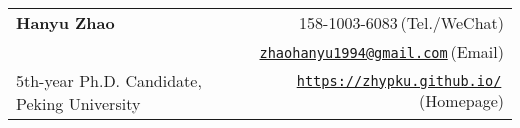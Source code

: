 
\newcommand{\paint}[3]{
    \begin{minipage}{#1}
        \texttt{[image: \#3]}
    \end{minipage} 
}

\newcommand{\myheader}{
    \begin{tabular*}{\textwidth}{l@{\extracolsep{\fill}}r}
        \specialrule{0em}{4pt}{4pt}
        \textbf{{\LARGE Hanyu Zhao}} & 158-1003-6083$\,${\color{labelgrey}(Tel./WeChat)}\\
        & \href{mailto:zhaohanyu@pku.edu.cn}{\texttt{zhaohanyu1994@gmail.com}}$\,${\color{labelgrey}(Email)} \\
        {\large 5th-year Ph.D. Candidate, Peking University} & \href{https://zhypku.github.io}{\texttt{https://zhypku.github.io/}}$\,${\color{labelgrey}(Homepage)} \\
    \end{tabular*}\\\vspace{0.1in}
}

\myheader

